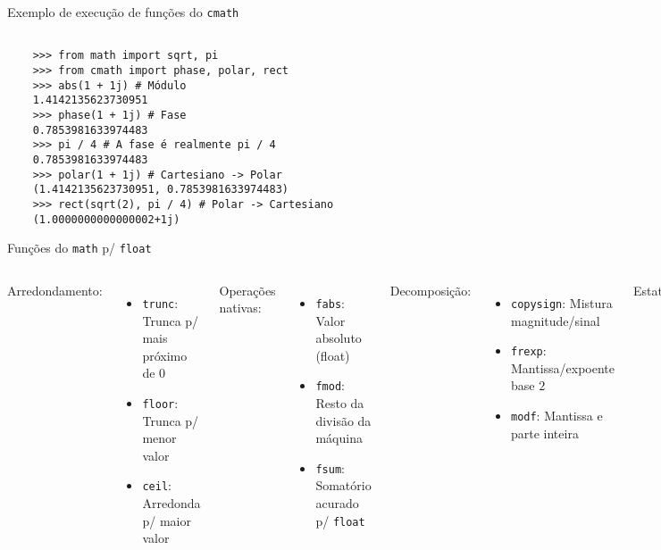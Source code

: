 \documentclass[utf8]{beamer}
\begin{document}
\begin{frame}[fragile]{Exemplo de execução
                       de funções do \texttt{cmath}}
  \begin{verbatim}

    >>> from math import sqrt, pi
    >>> from cmath import phase, polar, rect
    >>> abs(1 + 1j) # Módulo
    1.4142135623730951
    >>> phase(1 + 1j) # Fase
    0.7853981633974483
    >>> pi / 4 # A fase é realmente pi / 4
    0.7853981633974483
    >>> polar(1 + 1j) # Cartesiano -> Polar
    (1.4142135623730951, 0.7853981633974483)
    >>> rect(sqrt(2), pi / 4) # Polar -> Cartesiano
    (1.0000000000000002+1j)

  \end{verbatim}
\end{frame}


\begin{frame}{Funções do \texttt{math} p/ \texttt{float}}
  \begin{columns}
    Arredondamento:
    \begin{itemize}
      \item \texttt{trunc}: Trunca p/ mais próximo de 0
      \item \texttt{floor}: Trunca p/ menor valor
      \item \texttt{ceil}: Arredonda p/ maior valor
    \end{itemize}

    Operações nativas:
    \begin{itemize}
      \item \texttt{fabs}: Valor absoluto (float)
      \item \texttt{fmod}: Resto da divisão da máquina
      \item \texttt{fsum}: Somatório acurado p/
                                       \texttt{float}
    \end{itemize}

    Decomposição:
    \begin{itemize}
      \item \texttt{copysign}: Mistura magnitude/sinal
      \item \texttt{frexp}: Mantissa/expoente base $2$
      \item \texttt{modf}: Mantissa e parte inteira
    \end{itemize}

    Estatística:
    \begin{itemize}
      \item \texttt{gamma}: Gamma de Euler
      \item \texttt{erf}: Função erro (integral da normal)
    \end{itemize}


\end{columns}
\end{frame}
\end{document}
